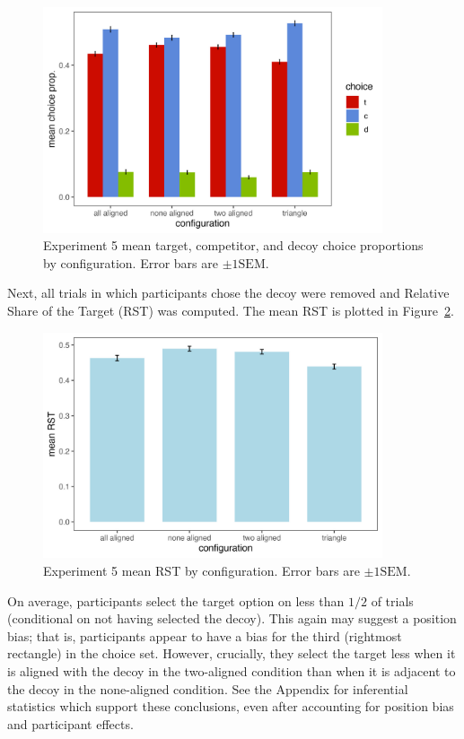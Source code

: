 \begin{figure}
   \includegraphics[width=100mm]{figures/comparability_crit_choice_by_config.jpeg}
   \caption{Experiment 5 mean target, competitor, and decoy choice proportions by configuration. Error bars are $\pm1\mathrm{SEM}$.}
   \label{fig:comparability_crit_mean_tcd_choices}
\end{figure}

Next, all trials in which participants chose the decoy were removed and Relative Share of the Target (RST) was computed. The mean RST is plotted in Figure~\ref{fig:comparability_crit_mean_target_choices}.

\begin{figure}
   \includegraphics[width=100mm]{figures/comparability_crit_rst_by_config.jpeg}
   \caption{Experiment 5 mean RST by configuration. Error bars are $\pm1\mathrm{SEM}$.}
   \label{fig:comparability_crit_mean_target_choices}
\end{figure}

On average, participants select the target option on less than $1/2$ of trials (conditional on not having selected the decoy). This again may suggest a position bias; that is, participants appear to have a bias for the third (rightmost rectangle) in the choice set. However, crucially, they select the target less when it is aligned with the decoy in the two-aligned condition than when it is adjacent to the decoy in the none-aligned condition. See the Appendix for inferential statistics which support these conclusions, even after accounting for position bias and participant effects.

